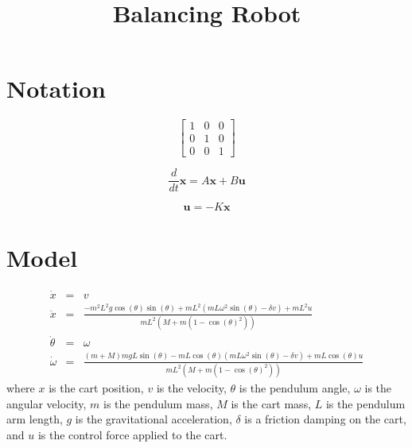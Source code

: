 \documentclass[]{article}
\title{Balancing Robot}
\date{}
\newcommand{\bx}{\boldsymbol{x}}
\newcommand{\bu}{\boldsymbol{u}}
\begin{document}
	\maketitle
	\section*{Notation}
	
	\begin{equation}
	\begin{bmatrix}
		1 & 0 & 0 \\
		0 & 1 & 0 \\
		0 & 0 & 1
	\end{bmatrix}
	\end{equation}

\begin{equation}
	\frac{d}{dt} \bx = A \bx + B \bu
\end{equation}

\begin{equation}
	\bu = -K \bx
\end{equation}
	\section*{Model}
	
	\begin{eqnarray}
		\dot{x} & = & v \\
		\ddot{x}          & = & \frac{-m^2L^2g \cos(\theta)\sin(\theta) + mL^2(mL\omega^2 \sin(\theta)-\delta v)+mL^2u }{mL^2(M+m(1-\cos(\theta)^2))} \\
		\dot{\theta}  &= & \omega \\
		\dot{\omega}  &= & \frac{(m+M)mgL\sin(\theta)-mL\cos(\theta)(mL\omega^2\sin(\theta)-\delta v)+mL\cos(\theta)u}{mL^2(M+m(1-\cos(\theta)^2))}
	\end{eqnarray}
	where $x$ is the cart position, $v$ is the velocity, $\theta$ is the pendulum angle, $\omega$ is the angular velocity, $m$ is the pendulum mass, $M$ is the cart mass, $L$ is the pendulum arm length, $g$ is the gravitational acceleration, $\delta$ is a friction damping on the cart, and $u$ is the control force applied to the cart.
	


	
\end{document}
